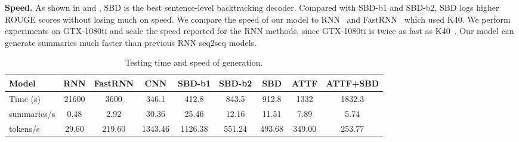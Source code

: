 \textbf{Speed.} 
As shown in  and , 
SBD is the best sentence-level backtracking decoder.
Compared with SBD-b1 and SBD-b2,
SBD logs higher ROUGE scores without losing much on speed. 
We compare the speed of our model to RNN~\cite{SeeLM17} and FastRNN~\cite{P18-1063}
which used K40. 
We perform experiments on GTX-1080ti and scale the speed 
reported for the RNN methods,
since GTX-1080ti is twice as fast as K40~\cite{gehring2017convs2s}.
Our model can 
generate summaries much faster than previous RNN seq2seq models.
\begin{table}[th!]
\scriptsize
\centering
\caption{Testing time and speed of generation.}
\begin{tabular}{|l|cc|cccccc|}
\hline
Model & RNN & FastRNN & CNN & SBD-b1 & SBD-b2 & SBD & ATTF & ATTF+SBD \\
\hline
Time (s) & 21600 & 3600 & 346.1 & 412.8 & 843.5 & 912.8 & 1332 & 1832.3 \\
summaries/s & 0.48 & 2.92 & 30.36 & 25.46 & 12.16 & 11.51 & 7.89 & 5.74 \\ 
tokens/s & 29.60 & 219.60 & 1343.46 & 1126.38& 551.24 & 493.68 & 349.00 & 253.77 \\
\hline
\end{tabular}
\label{tab:eval_speed}
\end{table}



